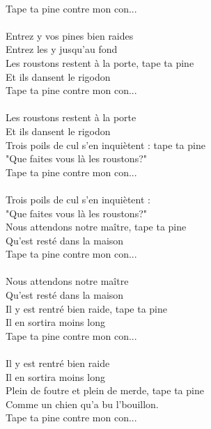 \\Tape ta pine contre mon con...
\\\\Entrez y vos pines bien raides
\\Entrez les y jusqu'au fond
\\Les roustons restent à la porte, tape ta pine
\\Et ils dansent le rigodon
\\Tape ta pine contre mon con...
\\\\Les roustons restent à la porte
\\Et ils dansent le rigodon
\\Trois poils de cul s'en inquiètent : tape ta pine
\\"Que faites vous là les roustons?"
\\Tape ta pine contre mon con...
\\\\Trois poils de cul s'en inquiètent : 
\\"Que faites vous là les roustons?"
\\Nous attendons notre maître, tape ta pine
\\Qu'est resté dans la maison
\\Tape ta pine contre mon con...
\\\\Nous attendons notre maître
\\Qu'est resté dans la maison
\\Il y est rentré bien raide, tape ta pine
\\Il en sortira moins long
\\Tape ta pine contre mon con...
\\\\Il y est rentré bien raide
\\Il en sortira moins long
\\Plein de foutre et plein de merde, tape ta pine
\\Comme un chien qu'a bu l'bouillon.
\\Tape ta pine contre mon con...

\breakpage